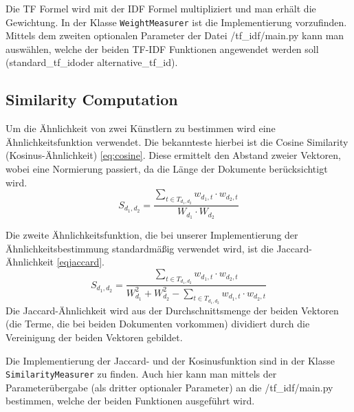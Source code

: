 \documentclass[prodmode,acmtecs]{acmsmall} %
\begin{document}
Die TF Formel wird mit der IDF Formel multipliziert und man erhält die Gewichtung. In der Klasse \texttt{WeightMeasurer} ist die Implementierung vorzufinden. Mittels dem zweiten optionalen Parameter der Datei /tf\_idf/main.py kann man auswählen, welche der beiden TF-IDF Funktionen angewendet werden soll (\glqq standard\_tf\_id\grqq oder \glqq alternative\_tf\_id\grqq).

\subsection{Similarity Computation}
Um die Ähnlichkeit von zwei Künstlern zu bestimmen wird eine Ähnlichkeitsfunktion verwendet. Die bekannteste hierbei ist die Cosine Similarity (Kosinus-Ähnlichkeit) \eqref{eq:cosine}. Diese ermittelt den Abstand zweier Vektoren, wobei eine Normierung passiert, da die Länge der Dokumente berücksichtigt wird. 
\begin{equation}\label{eq:cosine}
  S_{d_1, d_2} = \frac{\sum_{t \in T_{d_1, d_2}}{w_{d_1, t} \cdot w_{d_2, t}}}{W_{d_1} \cdot W_{d_2}}
\end{equation}

Die zweite Ähnlichkeitsfunktion, die bei unserer Implementierung der Ähnlichkeitsbestimmung standardmäßig verwendet wird, ist die Jaccard-Ähnlichkeit \eqref{eqjaccard}. 
\begin{equation}\label{eqjaccard}
  S_{d_1, d_2} = \frac{\sum_{t \in T_{d_1, d_2}}{w_{d_1, t} \cdot w_{d_2, t}}}{W_{d_1}^2 + W_{d_2}^2 - \sum_{t \in T_{d_1, d_2}}{w_{d_1, t} \cdot w_{d_2, t}}}
\end{equation}
Die Jaccard-Ähnlichkeit wird aus der Durchschnittsmenge der beiden Vektoren (die Terme, die bei beiden Dokumenten vorkommen) dividiert durch die Vereinigung der beiden Vektoren gebildet.

Die Implementierung der Jaccard- und der Kosinusfunktion sind in der Klasse \texttt{SimilarityMeasurer} zu finden. Auch hier kann man mittels der Parameterübergabe (als dritter optionaler Parameter) an die /tf\_idf/main.py bestimmen, welche der beiden Funktionen ausgeführt wird.
\end{document}
